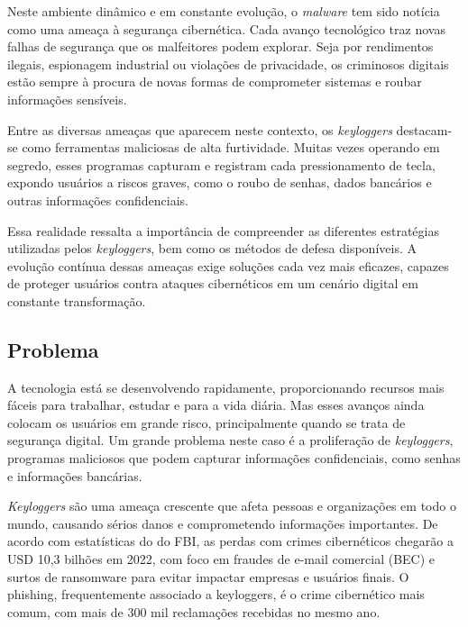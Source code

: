 \documentclass[12pt]{article}
\begin{document}
Neste ambiente dinâmico e em constante evolução, o \textit{malware} tem sido notícia como uma ameaça à segurança cibernética. Cada avanço tecnológico traz novas falhas de segurança que os malfeitores podem explorar. Seja por rendimentos ilegais, espionagem industrial ou violações de privacidade, os criminosos digitais estão sempre à procura de novas formas de comprometer sistemas e roubar informações sensíveis.

Entre as diversas ameaças que aparecem neste contexto, os \textit{keyloggers} destacam-se como ferramentas maliciosas de alta furtividade. Muitas vezes operando em segredo, esses programas capturam e registram cada pressionamento de tecla, expondo usuários a riscos graves, como o roubo de senhas, dados bancários e outras informações confidenciais.

Essa realidade ressalta a importância de compreender as diferentes estratégias utilizadas pelos \textit{keyloggers}, bem como os métodos de defesa disponíveis. A evolução contínua dessas ameaças exige soluções cada vez mais eficazes, capazes de proteger usuários contra ataques cibernéticos em um cenário digital em constante transformação.

\subsection{Problema}


A tecnologia está se desenvolvendo rapidamente, proporcionando recursos mais fáceis para trabalhar, estudar e para a vida diária. Mas esses avanços ainda colocam os usuários em grande risco, principalmente quando se trata de segurança digital. Um grande problema neste caso é a proliferação de \textit{keyloggers}, programas maliciosos que podem capturar informações confidenciais, como senhas e informações bancárias.

\textit{Keyloggers} são uma ameaça crescente que afeta pessoas e organizações em todo o mundo, causando sérios danos e comprometendo informações importantes. De acordo com estatísticas do \citep{securityintelligence2023} do FBI, as perdas com crimes cibernéticos chegarão a USD 10,3 bilhões em 2022, com foco em fraudes de e-mail comercial (BEC) e surtos de ransomware para evitar impactar empresas e usuários finais. O phishing, frequentemente associado a keyloggers, é o crime cibernético mais comum, com mais de 300 mil reclamações recebidas no mesmo ano.
\end{document}
